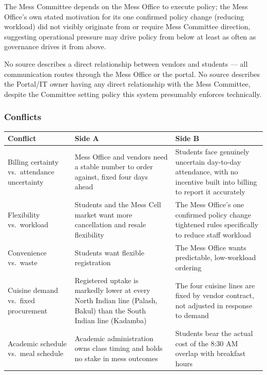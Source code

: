 \documentclass[11pt]{article}
\begin{document}
The Mess Committee depends on the Mess Office to execute policy; the Mess Office's
own stated motivation for its one confirmed policy change (reducing workload) did
not visibly originate from or require Mess Committee direction, suggesting
operational pressure may drive policy from below at least as often as governance
drives it from above.

No source describes a direct relationship between vendors and students --- all
communication routes through the Mess Office or the portal. No source describes the
Portal/IT owner having any direct relationship with the Mess Committee, despite the
Committee setting policy this system presumably enforces technically.

\subsubsection*{Conflicts}

\begin{longtable}{L{0.28\textwidth}L{0.33\textwidth}L{0.33\textwidth}}
\toprule
\textbf{Conflict} & \textbf{Side A} & \textbf{Side B} \\
\midrule
\endhead
Billing certainty vs.\ attendance uncertainty & Mess Office and vendors need a
stable number to order against, fixed four days ahead & Students face genuinely
uncertain day-to-day attendance, with no incentive built into billing to report it
accurately \\[6pt]

Flexibility vs.\ workload & Students and the Mess Cell market want more
cancellation and resale flexibility & The Mess Office's one confirmed policy change
tightened rules specifically to reduce staff workload \\[6pt]

Convenience vs.\ waste & Students want flexible registration & The Mess Office wants
predictable, low-workload ordering \\[6pt]

Cuisine demand vs.\ fixed procurement & Registered uptake is markedly lower at every
North Indian line (Palash, Bakul) than the South Indian line (Kadamba) & The four
cuisine lines are fixed by vendor contract, not adjusted in response to demand \\[6pt]

Academic schedule vs.\ meal schedule & Academic administration owns class timing and
holds no stake in mess outcomes & Students bear the actual cost of the 8:30 AM
overlap with breakfast hours \\
\bottomrule
\end{longtable}
\end{document}
